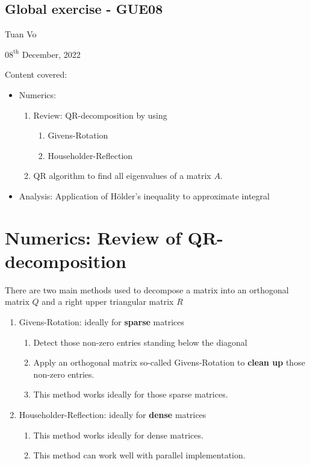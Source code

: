 \documentclass[12pt]{article}
\begin{document}
\begin{center}
	\section*{Global exercise - GUE08}
\end{center}
\begin{center}
	Tuan Vo
\end{center}
\begin{center}
	$08^{\text{th}}$ December, 2022
\end{center}
Content covered:
\begin{itemize}
	\item[\checkmark] Numerics:
	      \begin{enumerate}
		      \item Review: QR-decomposition by using
		            \begin{enumerate}
			            \item Givens-Rotation
			            \item Householder-Reflection
		            \end{enumerate}
		      \item QR algorithm to find all eigenvalues of a matrix $A$.
	      \end{enumerate}
	\item[\checkmark] Analysis: Application of Hölder's inequality to approximate integral
\end{itemize}
\section{Numerics: Review of QR-decomposition}
There are two main methods used to decompose a matrix into an orthogonal matrix $Q$
and a right upper triangular matrix $R$
\begin{enumerate}
	\item Givens-Rotation: ideally for \textbf{sparse} matrices
	      \begin{enumerate}
		      \item Detect those non-zero entries standing below the diagonal
		      \item Apply an orthogonal matrix so-called Givens-Rotation to \textbf{clean up} those non-zero entries.
		      \item This method works ideally for those sparse matrices.
	      \end{enumerate}
	\item Householder-Reflection: ideally for \textbf{dense} matrices
	      \begin{enumerate}
		      \item This method works ideally for dense matrices.
		      \item This method can work well with parallel implementation.
	      \end{enumerate}
\end{enumerate}
\clearpage
\end{document}
